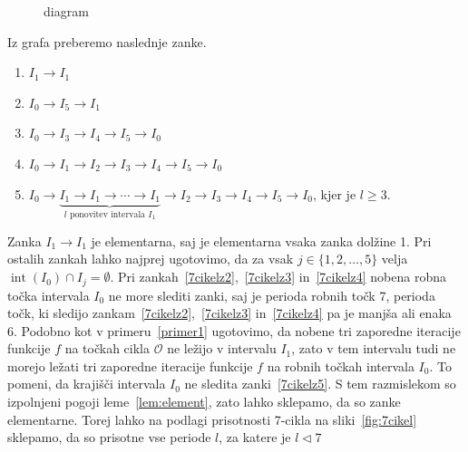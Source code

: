 \documentclass[mat2]{fmfdelo}
\DeclareMathOperator{\interior}{int}
\begin{document}
\begin{primer}[7-cikel]
\begin{figure}[h]
  \caption[Primer vektorske slike.]{diagram}
  \label{fig:6kotnik}
\end{figure}
Iz grafa preberemo naslednje zanke.
\begin{enumerate}
\item $I_1 \to I_1$
\item $I_0 \to I_5 \to I_1$ \label{7cikelz2}
\item $I_0 \to I_3 \to I_4 \to I_5 \to I_0$ \label{7cikelz3}
\item $I_0 \to I_1 \to I_2 \to I_3 \to I_4 \to I_5 \to I_0$ \label{7cikelz4}
\item $I_0 \to \underbrace{I_1 \to I_1 \to \cdots  \to I_1}_{l \text{ ponovitev intervala } I_1} \to I_2 \to I_3 \to I_4 \to I_5 \to I_0$, kjer je $l\geq 3$. \label{7cikelz5}
\end{enumerate}
Zanka $I_1 \to I_1$ je elementarna, saj je elementarna vsaka zanka dolžine 1. Pri ostalih zankah lahko najprej ugotovimo, da za vsak $j \in \{1, 2, \dots, 5\}$ velja $\interior(I_0) \cap I_j = \emptyset$. Pri zankah~\ref{7cikelz2},~\ref{7cikelz3} in~\ref{7cikelz4} nobena robna točka intervala $I_0$ ne more slediti zanki, saj je perioda robnih točk 7, perioda točk, ki sledijo zankam~\ref{7cikelz2},~\ref{7cikelz3} in~\ref{7cikelz4} pa je manjša ali enaka 6. Podobno kot v primeru~\ref{primer1} ugotovimo, da nobene tri zaporedne iteracije funkcije $f$ na točkah cikla $\mathcal{O}$ ne ležijo v intervalu $I_1$, zato v tem intervalu tudi ne morejo ležati tri zaporedne iteracije funkcije $f$ na robnih točkah intervala $I_0$. To pomeni, da krajišči intervala $I_0$ ne sledita zanki~\ref{7cikelz5}. S tem razmislekom so izpolnjeni pogoji leme~\ref{lem:element}, zato lahko sklepamo, da so zanke elementarne. Torej lahko na podlagi prisotnosti 7-cikla na sliki~\ref{fig:7cikel} sklepamo, da so prisotne vse periode $l$, za katere je $l \triangleleft 7$
\end{primer}
\end{document}
